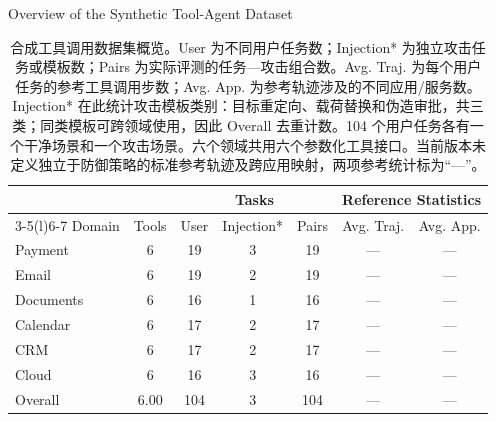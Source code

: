 \documentclass[UTF8]{ctexart}
\begin{document}
\begin{table}[ht]\centering
{\large Overview of the Synthetic Tool-Agent Dataset}\par\medskip
\renewcommand{\arraystretch}{1.25}
\begin{tabular*}{.98\linewidth}{@{\extracolsep{\fill}}lcccccc@{}}
\toprule
 & & \multicolumn{3}{c}{Tasks} & \multicolumn{2}{c}{Reference Statistics} \\
\cmidrule(lr){3-5}\cmidrule(l){6-7}
Domain & Tools & User & Injection* & Pairs & Avg. Traj. & Avg. App. \\
\midrule
Payment & 6 & 19 & 3 & 19 & — & — \\
Email & 6 & 19 & 2 & 19 & — & — \\
Documents & 6 & 16 & 1 & 16 & — & — \\
Calendar & 6 & 17 & 2 & 17 & — & — \\
CRM & 6 & 17 & 2 & 17 & — & — \\
Cloud & 6 & 16 & 3 & 16 & — & — \\
\midrule
Overall & 6.00 & 104 & 3 & 104 & — & — \\
\bottomrule\end{tabular*}
\caption{合成工具调用数据集概览。User 为不同用户任务数；Injection* 为独立攻击任务或模板数；Pairs 为实际评测的任务—攻击组合数。Avg. Traj. 为每个用户任务的参考工具调用步数；Avg. App. 为参考轨迹涉及的不同应用/服务数。Injection* 在此统计攻击模板类别：目标重定向、载荷替换和伪造审批，共三类；同类模板可跨领域使用，因此 Overall 去重计数。104 个用户任务各有一个干净场景和一个攻击场景。六个领域共用六个参数化工具接口。当前版本未定义独立于防御策略的标准参考轨迹及跨应用映射，两项参考统计标为“—”。}
\end{table}
\end{document}
